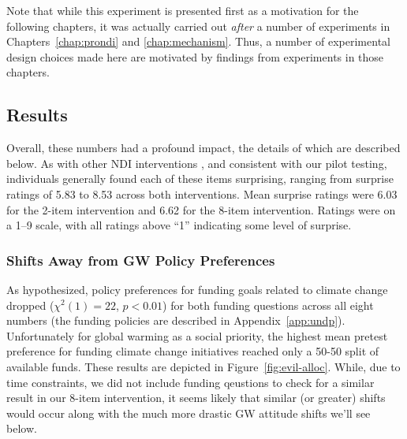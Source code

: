 Note that while this experiment is presented first as a motivation for the
following chapters, it was actually carried out \emph{after} a number of
experiments in Chapters~\ref{chap:prondi} and \ref{chap:mechanism}. Thus, a
number of experimental design choices made here are motivated by findings from
experiments in those chapters.

\subsection{Results}

Overall, these numbers had a profound impact, the details of which are described
below. As with other NDI interventions
\parencite[e.g.,][]{ranney_designing_2008}, and consistent with our pilot testing,
individuals generally found each of these items surprising, ranging from
surprise ratings of 5.83 to 8.53 across both interventions. Mean surprise
ratings were 6.03 for the 2-item intervention and 6.62 for the 8-item
intervention. Ratings were on a 1--9 scale, with all ratings above “1”
indicating some level of surprise.

\subsubsection{Shifts Away from GW Policy Preferences}

As hypothesized, policy preferences for funding goals related to climate
change dropped ($\chi^2(1)=22$, $p<0.01$) for both funding questions across all
eight numbers (the funding policies are described in Appendix~\ref{app:undp}).
Unfortunately for global warming as a social priority, the highest mean pretest
preference for funding climate change initiatives reached only a 50-50 split of
available funds. These results are depicted in Figure~\ref{fig:evil-alloc}.
While, due to time constraints, we did not include funding qeustions to check
for a similar result in our 8-item intervention, it seems likely that similar
(or greater) shifts would occur along with the much more drastic GW attitude
shifts we'll see below.

